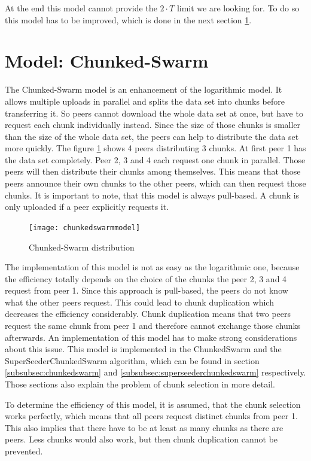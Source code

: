 At the end this model cannot provide the $2 \cdot T$ limit we are looking for. To do so this model has to be improved, which is done in the next section \ref{subsubsec:chunkedswarmmodel}.


\section{Model: Chunked-Swarm}
\label{subsubsec:chunkedswarmmodel}
The Chunked-Swarm model is an enhancement of the logarithmic model. It allows multiple uploads in parallel and splits the data set into chunks before transferring it. So peers cannot download the whole data set at once, but have to request each chunk individually instead. Since the size of those chunks is smaller than the size of the whole data set, the peers can help to distribute the data set more quickly. The figure \ref{fig:chunkedswarmmodel} shows 4 peers distributing 3 chunks. At first peer 1 has the data set completely. Peer 2, 3 and 4 each request one chunk in parallel. Those peers will then distribute their chunks among themselves. This means that those peers announce their own chunks to the other peers, which can then request those chunks. It is important to note, that this model is always pull-based. A chunk is only uploaded if a peer explicitly requests it.

\begin{figure}[H]
\centering
\texttt{[image: chunkedswarmmodel]}
\caption{Chunked-Swarm distribution}
\label{fig:chunkedswarmmodel}
\end{figure}

The implementation of this model is not as easy as the logarithmic one, because the efficiency totally depends on the choice of the chunks the peer 2, 3 and 4 request from peer 1. Since this approach is pull-based, the peers do not know what the other peers request. This could lead to chunk duplication which decreases the efficiency considerably. Chunk duplication means that two peers request the same chunk from peer 1 and therefore cannot exchange those chunks afterwards. An implementation of this model has to make strong considerations about this issue. This model is implemented in the ChunkedSwarm and the SuperSeederChunkedSwarm algorithm, which can be found in section \ref{subsubsec:chunkedswarm} and \ref{subsubsec:superseederchunkedswarm} respectively. Those sections also explain the problem of chunk selection in more detail.

To determine the efficiency of this model, it is assumed, that the chunk selection works perfectly, which means that all peers request distinct chunks from peer 1. This also implies that there have to be at least as many chunks as there are peers. Less chunks would also work, but then chunk duplication cannot be prevented.

